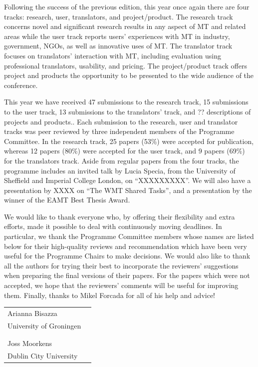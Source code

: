 \documentclass[a4paper,11pt,twoside]{book}
\begin{document}
Following the success of the previous edition, this year once again there are four tracks: research, user, translators, and project/product. The research track concerns novel and significant research results in any aspect of MT and related areas while the user track reports users’ experiences with MT in industry, government, NGOs, as well as innovative uses of MT. The translator track focuses on translators’ interaction with MT, including evaluation using professional translators, usability, and pricing. The project/product track offers project and products the opportunity to be presented to the wide audience of the conference.

This year we have received 47 submissions to the research track, 15 submissions to the
user track, 13 submissions to the translators’ track, and ?? descriptions of projects and products.. Each submission to the research, user and translator tracks was peer reviewed by three independent members of the Programme Committee. In the research track, 25 papers (53\%) were accepted for publication, whereas 12 papers (80\%) were accepted for the user track, and 9 papers (69\%) for the translators track. 
Aside from regular papers from the four tracks, the programme includes an invited talk by Lucia Specia, from the University of Sheffield and Imperial College London, on “XXXXXXXXX”. We will also have a presentation by XXXX on “The WMT Shared Tasks”, and a presentation by the winner of the EAMT Best Thesis Award.

We would like to thank everyone who, by offering their flexibility and extra efforts, made it possible to deal with continuously moving deadlines. In particular, we thank the Programme Committee members whose names are listed below for their high-quality reviews and recommendation which have been very useful for the Programme Chairs to make decisions. We would also like to thank all the authors for trying their best to incorporate the reviewers’ suggestions when preparing the final versions of their papers. For the papers which were not accepted, we hope that the reviewers’ comments will be useful for improving them. Finally, thanks to Mikel Forcada for all of his help and advice!

\vspace{1cm}
\begin{center}
\begin{tabular}{ll}
Arianna Bisazza\\
University of Groningen\\
\\
\\
Joss Moorkens\\
Dublin City University\\
\end{tabular}

\end{center}
\end{document}
